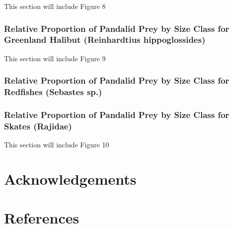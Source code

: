 \documentclass[
]{article}
\begin{document}
This section will include Figure 8

\hypertarget{relative-proportion-of-pandalid-prey-by-size-class-for-greenland-halibut-reinhardtius-hippoglossides}{%
\subsubsection{\texorpdfstring{Relative Proportion of Pandalid Prey by
Size Class for Greenland Halibut (\textbf{Reinhardtius
hippoglossides})}{Relative Proportion of Pandalid Prey by Size Class for Greenland Halibut (Reinhardtius hippoglossides)}}\label{relative-proportion-of-pandalid-prey-by-size-class-for-greenland-halibut-reinhardtius-hippoglossides}}

This section will include Figure 9

\hypertarget{relative-proportion-of-pandalid-prey-by-size-class-for-redfishes-sebastes-sp.}{%
\subsubsection{\texorpdfstring{Relative Proportion of Pandalid Prey by
Size Class for Redfishes (\textbf{Sebastes
sp.})}{Relative Proportion of Pandalid Prey by Size Class for Redfishes (Sebastes sp.)}}\label{relative-proportion-of-pandalid-prey-by-size-class-for-redfishes-sebastes-sp.}}

\hypertarget{relative-proportion-of-pandalid-prey-by-size-class-for-skates-rajidae}{%
\subsubsection{\texorpdfstring{Relative Proportion of Pandalid Prey by
Size Class for Skates
(\textbf{Rajidae})}{Relative Proportion of Pandalid Prey by Size Class for Skates (Rajidae)}}\label{relative-proportion-of-pandalid-prey-by-size-class-for-skates-rajidae}}

This section will include Figure 10

\hypertarget{acknowledgements}{%
\section{Acknowledgements}\label{acknowledgements}}

\hypertarget{references}{%
\section{References}\label{references}}
\end{document}
